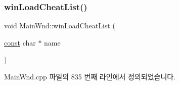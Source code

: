 \mbox{\label{class_main_wnd_adfe445d042cd87dfa30b07fdcfa7eeff}} 
\subsubsection{\texorpdfstring{win\+Load\+Cheat\+List()}{winLoadCheatList()}}
{\footnotesize\ttfamily void Main\+Wnd\+::win\+Load\+Cheat\+List (\begin{DoxyParamCaption}\item[{\mbox{\hyperlink{getopt1_8c_a2c212835823e3c54a8ab6d95c652660e}{const}} char $\ast$}]{name }\end{DoxyParamCaption})}



Main\+Wnd.\+cpp 파일의 835 번째 라인에서 정의되었습니다.


